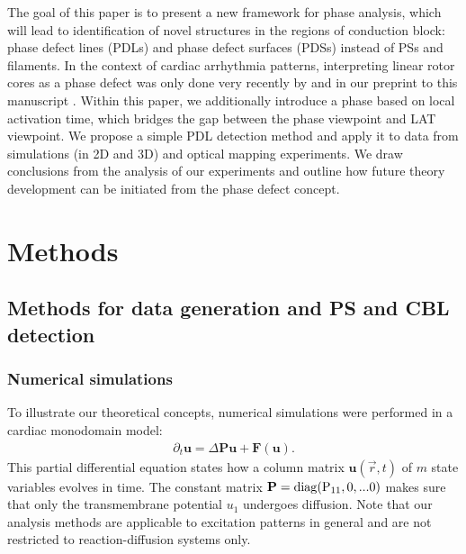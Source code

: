 \documentclass{article}
\newcommand{\uu}{\mathbf{u}}
\newcommand{\dd}{\partial}
\begin{document}
The goal of this paper is to present a new framework for phase analysis, which will lead to identification of novel structures in the regions of conduction block: phase defect lines (PDLs) and phase defect surfaces (PDSs) instead of PSs and filaments.
In the context of cardiac arrhythmia patterns, interpreting linear rotor cores as a phase defect was only done very recently by \cite{Tomii:2021} and in our preprint to this manuscript \citep{Arno:2021arxiv}. Within this paper, we additionally introduce a phase based on local activation time, which bridges the gap between the phase viewpoint and LAT viewpoint. We propose a simple PDL detection method and apply it to data from simulations (in 2D and 3D) and optical mapping experiments. We draw conclusions from the analysis of our experiments and outline how future theory development can be initiated from the phase defect concept. 


\section{Methods} \label{sec:methods}

\subsection{Methods for data generation and PS and CBL detection}

\subsubsection{Numerical simulations}

To illustrate our theoretical concepts, numerical simulations were performed in a cardiac monodomain model:
\begin{align}
    \dd_t \uu =  \Delta \mathbf{P} \uu +  \mathbf{F}(\uu). \label{RDE}
\end{align}
This partial differential equation states how a column matrix $\uu(\vec{r},t)$ of $m$ state variables evolves in time. The constant matrix $\mathbf{P} = \rm{diag}(P_{11},0,...0)$ makes sure that only the transmembrane potential $u_1$ undergoes diffusion. 
Note that our analysis methods are applicable to excitation patterns in general and are not restricted to reaction-diffusion systems only. 
\end{document}
